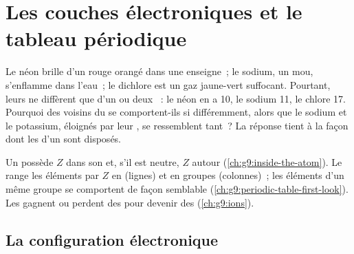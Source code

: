 \chapter{Les couches électroniques et le tableau périodique}\label{ch:g10:electron-shells}

Le néon brille d'un rouge orangé dans une enseigne~; le sodium, un 
mou, s'enflamme dans l'eau~; le dichlore est un gaz jaune-vert
suffocant. Pourtant, leurs  ne diffèrent que d'un ou deux
~: le néon en a 10, le sodium 11, le chlore 17. Pourquoi des
voisins du  se comportent-ils si différemment, alors
que le sodium et le potassium, éloignés par leur , se
ressemblent tant~? La réponse tient à la façon dont les  d'un
 sont disposés.

\begin{recall}
Un  possède $Z$  dans son  et, s'il est neutre, $Z$
 autour (\cref{ch:g9:inside-the-atom}). Le 
range les éléments par $Z$ en  (lignes) et en groupes
(colonnes)~; les éléments d'un même groupe se comportent de façon
semblable (\cref{ch:g9:periodic-table-first-look}). Les  gagnent
ou perdent des  pour devenir des  (\cref{ch:g9:ions}).
\end{recall}

\section{La configuration électronique}

